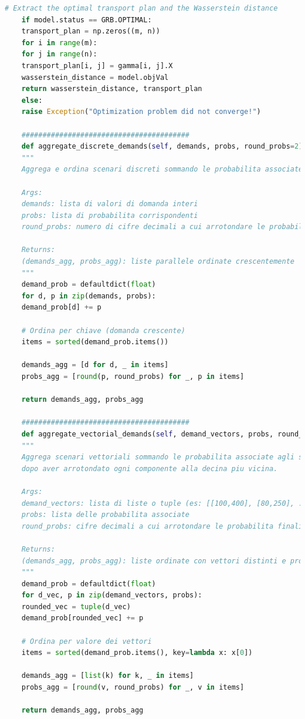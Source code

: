 \documentclass[a4paper,12pt]{article}
\begin{document}
\begin{lstlisting}[language=python,caption={class ScenarioTree},label={lst:class-scenario-tree}]
	# Extract the optimal transport plan and the Wasserstein distance
	if model.status == GRB.OPTIMAL:
	transport_plan = np.zeros((m, n))
	for i in range(m):
	for j in range(n):
	transport_plan[i, j] = gamma[i, j].X
	wasserstein_distance = model.objVal
	return wasserstein_distance, transport_plan
	else:
	raise Exception("Optimization problem did not converge!")
	
	########################################	
	def aggregate_discrete_demands(self, demands, probs, round_probs=2):
	"""
	Aggrega e ordina scenari discreti sommando le probabilita associate agli stessi valori di domanda.
	
	Args:
	demands: lista di valori di domanda interi
	probs: lista di probabilita corrispondenti
	round_probs: numero di cifre decimali a cui arrotondare le probabilita finali
	
	Returns:
	(demands_agg, probs_agg): liste parallele ordinate crescentemente
	"""
	demand_prob = defaultdict(float)
	for d, p in zip(demands, probs):
	demand_prob[d] += p
	
	# Ordina per chiave (domanda crescente)
	items = sorted(demand_prob.items())
	
	demands_agg = [d for d, _ in items]
	probs_agg = [round(p, round_probs) for _, p in items]
	
	return demands_agg, probs_agg
	
	########################################	
	def aggregate_vectorial_demands(self, demand_vectors, probs, round_probs=3):
	"""
	Aggrega scenari vettoriali sommando le probabilita associate agli stessi vettori di domanda,
	dopo aver arrotondato ogni componente alla decina piu vicina.
	
	Args:
	demand_vectors: lista di liste o tuple (es: [[100,400], [80,250], ...])
	probs: lista delle probabilita associate
	round_probs: cifre decimali a cui arrotondare le probabilita finali
	
	Returns:
	(demands_agg, probs_agg): liste ordinate con vettori distinti e probabilita sommate
	"""
	demand_prob = defaultdict(float)
	for d_vec, p in zip(demand_vectors, probs): 
	rounded_vec = tuple(d_vec)
	demand_prob[rounded_vec] += p
	
	# Ordina per valore dei vettori
	items = sorted(demand_prob.items(), key=lambda x: x[0])
	
	demands_agg = [list(k) for k, _ in items]
	probs_agg = [round(v, round_probs) for _, v in items]
	
	return demands_agg, probs_agg
	
\end{lstlisting}
\end{document}
